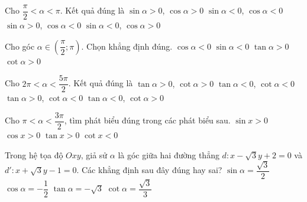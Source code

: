\begin{ex}%
	Cho $\dfrac{\pi}{2}<\alpha <\pi$. Kết quả đúng là 
	 \choice
		 {$\sin \alpha >0$, $\cos \alpha >0$}
		{$\sin  \alpha <0$, $\cos \alpha <0$}
		{\True  $\sin \alpha >0$, $\cos \alpha <0$}
		{$\sin \alpha <0$, $\cos  \alpha >0$}
\end{ex}

\begin{ex}%
	Cho góc $\alpha \in  \left(\dfrac{\pi}{2};\pi\right)$. Chọn khẳng định đúng.
	\choice 
		 {\True $\cos \alpha <0 $}
		{$\sin \alpha <0 $} 
		{$\tan \alpha  >0 $}
		{$\cot \alpha >0  $}
\end{ex}

\begin{ex}%
	Cho $2\pi <\alpha <\dfrac{5\pi}{2}$. Kết quả đúng  là
	 \choice
		{\True $\tan \alpha >0$, $\cot \alpha  >0$}
		 {$\tan \alpha <0$, $\cot \alpha <0$}
		{$\tan \alpha >0$, $\cot \alpha <0$} 
		{$\tan  \alpha <0$, $\cot \alpha >0$}
\end{ex}

\begin{ex}%
	Cho $\pi <\alpha  <\dfrac{3\pi}{2}$, tìm phát biểu đúng trong các phát biểu sau.
	\choice 
		 {$\sin x>0$}
		{$\cos  x>0$}
		{\True $\tan  x>0$}
		{$\cot x<0$} 
\end{ex}

\begin{ex}%
	Trong hệ tọa độ $Oxy$, giả sử $\alpha$ là góc giữa hai đường thẳng $d\colon x-\sqrt{3}y+2=0$ và $d'\colon x+\sqrt{3}y-1=0$. Các khẳng định sau đây  đúng hay sai?
	\choiceTF 
		 {\True $\sin\alpha=\dfrac{\sqrt{3}}{2}$}
		 {$\cos\alpha=-\dfrac{1}{2}$}
		{$\tan\alpha=-\sqrt{3}$} 
		{\True  $\cot\alpha=\dfrac{\sqrt{3}}{3}$}
\end{ex}

